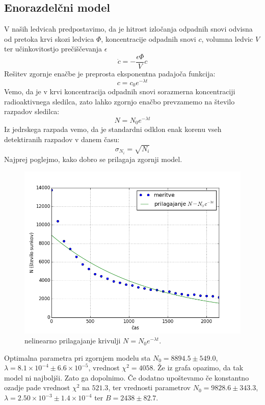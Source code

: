 \documentclass[slovene,11pt,a4paper]{article}
\numberwithin{equation}{section} %
\numberwithin{figure}{section} %
\numberwithin{table}{section} %
\begin{document}
\subsection{Enorazdelčni model}
V naših ledvicah predpostavimo, da je hitrost izločanja odpadnih snovi odvisna od pretoka krvi skozi ledvica $\Phi$, koncentracije odpadnih snovi $c$, volumna ledvic $V$ ter učinkovitostjo prečiščevanja $\epsilon$
\begin{equation}
\dot{c}=-\frac{\epsilon \Phi}{V} c
\end{equation}
Rešitev zgornje enačbe je preprosta eksponentna padajoča funkcija:
\begin{equation}
c=c_0 e^{- \lambda t}
\end{equation}
Vemo, da je v krvi koncentracija odpadnih snovi sorazmerna koncentraciji radioaktivnega sledilca, zato lahko zgornjo enačbo prevzamemo na število razpadov sledilca:
\begin{equation}
N=N_0 e^{- \lambda t}
\end{equation}
Iz jedrskega razpada vemo, da je standardni odklon enak korenu vseh detektiranih razpadov v danem času:
\begin{equation*}
\sigma_{N_i}=\sqrt{N_i}
\end{equation*}
Najprej poglejmo, kako dobro se prilagaja zgornji model.
\begin{figure}[h]
\centering
\includegraphics[scale=0.55]{slike/druga_najosnovna.png}
\caption[farmacevt-dodatni-parameter]{nelinearno prilagajanje krivulji $N=N_0 e^{-\lambda t}$.}
\label{fig:druga-1}
\end{figure}
Optimalna parametra pri zgornjem modelu sta $N_0=8894.5\pm 549.0$, $\lambda = 8.1 \times 10^{-4}\pm 6.6\times10^{-5}$, vrednost $\chi^2=4058$. Že iz grafa opazimo, da tak model ni najboljši. Zato ga dopolnimo. Če dodatno upoštevamo če konstantno ozadje pade vrednost $\chi^2$ na $521.3$, ter vrednosti parametrov $N_0=9828.6\pm 343.3$, $\lambda = 2.50\times10^{-3}\pm 1.4\times10^{-4}$ ter $B=2438 \pm 82.7$.
\end{document}
